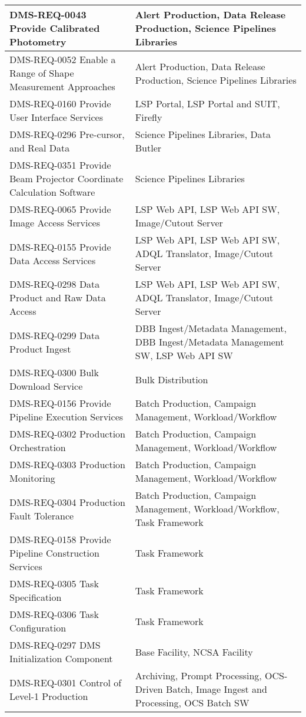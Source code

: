 \begin{xtabular}{p{0.4\textwidth}p{0.55\textwidth}}
DMS-REQ-0043 Provide Calibrated Photometry & Alert Production, Data Release Production, Science Pipelines Libraries \\ \hline
DMS-REQ-0052 Enable a Range of Shape Measurement Approaches & Alert Production, Data Release Production, Science Pipelines Libraries \\ \hline
DMS-REQ-0160 Provide User Interface Services & LSP Portal, LSP Portal and SUIT, Firefly \\ \hline
DMS-REQ-0296 Pre-cursor, and Real Data & Science Pipelines Libraries, Data Butler \\ \hline
DMS-REQ-0351 Provide Beam Projector Coordinate Calculation Software & Science Pipelines Libraries \\ \hline
DMS-REQ-0065 Provide Image Access Services & LSP Web API, LSP Web API SW, Image/Cutout Server \\ \hline
DMS-REQ-0155 Provide Data Access Services & LSP Web API, LSP Web API SW, ADQL Translator, Image/Cutout Server \\ \hline
DMS-REQ-0298 Data Product and Raw Data Access & LSP Web API, LSP Web API SW, ADQL Translator, Image/Cutout Server \\ \hline
DMS-REQ-0299 Data Product Ingest & DBB Ingest/Metadata Management, DBB Ingest/Metadata Management SW, LSP Web API SW \\ \hline
DMS-REQ-0300 Bulk Download Service & Bulk Distribution \\ \hline
DMS-REQ-0156 Provide Pipeline Execution Services & Batch Production, Campaign Management, Workload/Workflow \\ \hline
DMS-REQ-0302 Production Orchestration & Batch Production, Campaign Management, Workload/Workflow \\ \hline
DMS-REQ-0303 Production Monitoring & Batch Production, Campaign Management, Workload/Workflow \\ \hline
DMS-REQ-0304 Production Fault Tolerance & Batch Production, Campaign Management, Workload/Workflow, Task Framework \\ \hline
DMS-REQ-0158 Provide Pipeline Construction Services & Task Framework \\ \hline
DMS-REQ-0305 Task Specification & Task Framework \\ \hline
DMS-REQ-0306 Task Configuration & Task Framework \\ \hline
DMS-REQ-0297 DMS Initialization Component & Base Facility, NCSA Facility \\ \hline
DMS-REQ-0301 Control of Level-1 Production & Archiving, Prompt Processing, OCS-Driven Batch, Image Ingest and Processing, OCS Batch SW \\ \hline

\end{xtabular}
